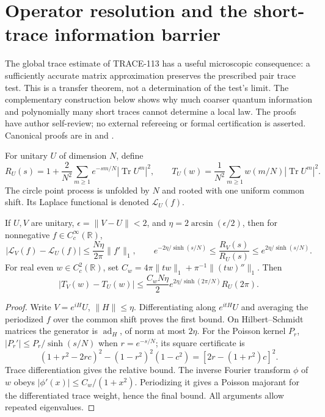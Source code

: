 \section{Operator resolution and the short-trace information barrier}
\label{sec:microscopic-operator-stability}
The global trace estimate of TRACE-113 has a useful microscopic consequence:
a sufficiently accurate matrix approximation preserves the prescribed pair
trace test. This is a transfer theorem, not a determination of the test's limit.
The complementary construction below shows why much coarser quantum information
and polynomially many short traces cannot determine a local law.
The proofs have author self-review; no external refereeing or formal certification
is asserted. Canonical proofs are in
and .

For unitary $U$ of dimension $N$, define
\[
 R_U(s)=1+\frac{2}{N^2}\sum_{m\ge1}e^{-sm/N}|\operatorname{Tr}U^m|^2,
 \qquad T_U(w)=\frac1{N^2}\sum_{m\ge1}w(m/N)|\operatorname{Tr}U^m|^2.
\]
The circle point process is unfolded by $N$ and rooted with one uniform common
shift. Its Laplace functional is denoted $\mathscr L_U(f)$.

\begin{theorem}
\label{thm:microscopic-unitary-stability}
If $U,V$ are unitary, $\epsilon=\|V-U\|<2$, and
$\eta=2\arcsin(\epsilon/2)$, then for nonnegative $f\in C_c^\infty(\mathbb R)$,
\[
 |\mathscr L_V(f)-\mathscr L_U(f)|\le\frac{N\eta}{2\pi}\|f'\|_1,
 \qquad e^{-2\eta/\sinh(s/N)}\le\frac{R_V(s)}{R_U(s)}
 \le e^{2\eta/\sinh(s/N)}.
\]
For real even $w\in C_c^2(\mathbb R)$, set
$C_w=4\pi\|tw\|_1+\pi^{-1}\|(tw)''\|_1$. Then
\[
 |T_V(w)-T_U(w)|\le\frac{C_wN\eta}{2}
 e^{2\eta/\sinh(2\pi/N)}R_U(2\pi).
\]
\end{theorem}
\begin{proof}
Write $V=e^{iH}U$, $\|H\|\le\eta$. Differentiating along $e^{itH}U$
and averaging the periodized $f$ over the common shift proves the first bound.
On Hilbert--Schmidt matrices the generator is $\operatorname{ad}_H$, of norm
at most $2\eta$. For the Poisson kernel $P_r$,
$|P_r'|\le P_r/\sinh(s/N)$ when $r=e^{-s/N}$; its square certificate is
\[
 (1+r^2-2rc)^2-(1-r^2)^2(1-c^2)=[2r-(1+r^2)c]^2.
\]
Trace differentiation gives the relative bound. The inverse Fourier transform
$\phi$ of $w$ obeys $|\phi'(x)|\le C_w/(1+x^2)$. Periodizing it gives a
Poisson majorant for the differentiated trace weight, hence the final bound.
All arguments allow repeated eigenvalues.
\end{proof}

